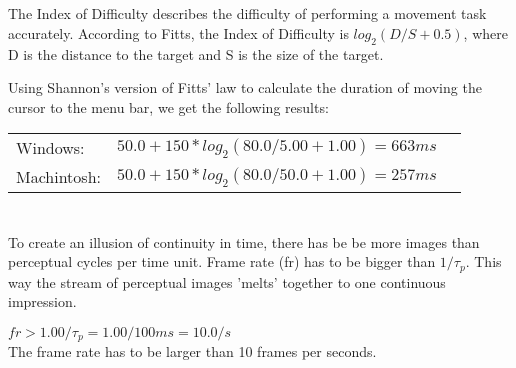 \documentclass{article}
\begin{document}
\section{}
The Index of Difficulty describes the difficulty of performing a movement task accurately. According to Fitts, the Index of Difficulty is $log_2(D/S+0.5)$, where D is the distance to the target and S is the size of the target.

Using Shannon's version of Fitts' law to calculate the duration of moving the cursor to the menu bar, we get the following results: \\
\begin{tabulary}{\textwidth}{L L L}
	Windows: & $50.0+150*log_2(80.0/5.00+1.00)=663ms$ &  \\
	Machintosh: & $50.0+150*log_2(80.0/50.0+1.00)=257ms$ &  \\
\end{tabulary}

\section{}
To create an illusion of continuity in time, there has be be more images than perceptual cycles per time unit. Frame rate (fr) has to be bigger than $1/\tau_p$. This way the stream of perceptual images 'melts' together to one continuous impression.

$fr>1.00/\tau_p=1.00/100ms=10.0/s$ \\
The frame rate has to be larger than 10 frames per seconds.
\end{document}
